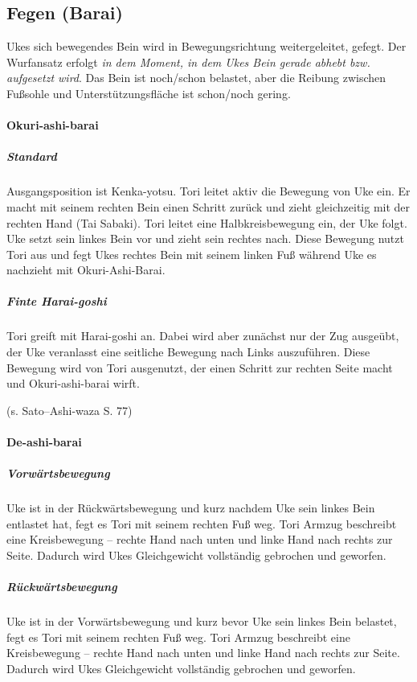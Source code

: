 \documentclass[justified, a4paper, notitlepage, captions=tableheading, nobib]{tufte-handout}
\begin{document}
\subsection{Fegen (Barai)}
\label{sec:org3bde550}
Ukes sich bewegendes Bein wird in Bewegungsrichtung weitergeleitet, gefegt. 
Der Wurfansatz erfolgt \emph{in dem Moment, in dem Ukes Bein gerade abhebt bzw. aufgesetzt wird}. 
Das Bein ist noch/schon belastet, aber die Reibung zwischen Fußsohle und Unterstützungsfläche ist schon/noch gering.

\paragraph{Okuri-ashi-barai }
\label{sec:orgb899932}

\subparagraph{Standard}
\label{sec:org6aa67f8}
Ausgangsposition ist Kenka-yotsu. Tori leitet aktiv die Bewegung von Uke ein. Er macht mit seinem rechten Bein einen Schritt zurück und zieht gleichzeitig mit der rechten Hand (Tai Sabaki). Tori leitet eine Halbkreisbewegung ein, der Uke folgt. Uke setzt sein linkes Bein vor und zieht sein rechtes nach. Diese Bewegung nutzt Tori aus und fegt Ukes rechtes Bein mit seinem linken Fuß während Uke es nachzieht mit Okuri-Ashi-Barai.

\subparagraph{Finte Harai-goshi}
\label{sec:org230a8d2}
Tori greift mit Harai-goshi an. Dabei wird aber zunächst nur der Zug ausgeübt, der Uke veranlasst eine seitliche Bewegung nach Links auszuführen. 
Diese Bewegung wird von Tori ausgenutzt, der einen Schritt zur rechten Seite macht und Okuri-ashi-barai wirft.

(s. Sato--Ashi-waza S. 77)

\paragraph{De-ashi-barai }
\label{sec:orgff33481}

\subparagraph{Vorwärtsbewegung}
\label{sec:org878e593}
Uke ist in der Rückwärtsbewegung und kurz nachdem Uke sein linkes Bein entlastet hat, fegt es Tori mit seinem rechten Fuß weg. Tori Armzug beschreibt eine Kreisbewegung – rechte Hand nach unten und linke Hand nach rechts zur Seite. Dadurch wird Ukes Gleichgewicht vollständig gebrochen und geworfen.

\subparagraph{Rückwärtsbewegung}
\label{sec:org89d0fd7}
Uke ist in der Vorwärtsbewegung und kurz bevor Uke sein linkes Bein belastet, fegt es Tori mit seinem rechten Fuß weg. Tori Armzug beschreibt eine Kreisbewegung – rechte Hand nach unten und linke Hand nach rechts zur Seite. Dadurch wird Ukes Gleichgewicht vollständig gebrochen und geworfen.
\end{document}
